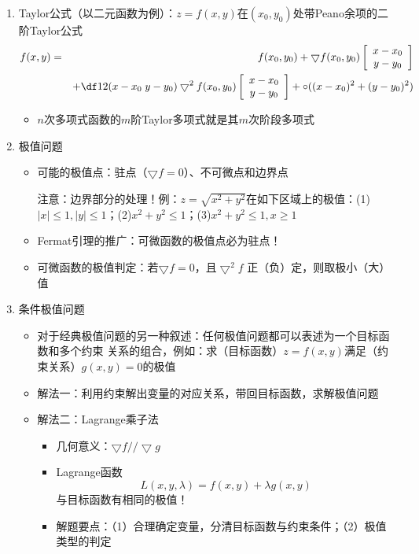 \begin{enumerate}
\begin{enumerate}[(1)]
\begin{itemize}
    \end{itemize}
    \item Taylor公式（以二元函数为例）：$z=f(x,y)$在$(x_0,y_0)$处带Peano余项的二阶Taylor公式
      \begin{eqnarray*}
      f(x,y)&=&f(x_0,y_0)+\bigtriangledown
      f(x_0,y_0)\left[\begin{array}{c}
      x-x_0\\ y-y_0
      \end{array}\right]\\
      &&+\df12(x-x_0\;y-y_0)\bigtriangledown^2f(x_0,y_0)
      \left[\begin{array}{c}
      x-x_0\\ y-y_0
      \end{array}\right]+\circ((x-x_0)^2+(y-y_0)^2)
	\end{eqnarray*}
	\begin{itemize}
	  \item $n$次多项式函数的$m$阶Taylor多项式就是其$m$次阶段多项式
	\end{itemize}
    \item 极值问题
    \begin{itemize}
      \item 可能的极值点：驻点（$\bigtriangledown f=0$）、不可微点和边界点
      
      注意：边界部分的处理！例：$z=\sqrt{x^2+y^2}$在如下区域上的极值：(1)
      $|x|\leq1,|y|\leq1$；(2)$x^2+y^2\leq 1$；(3)$x^2+y^2\leq 1,x\geq 1$
      \item Fermat引理的推广：可微函数的极值点必为驻点！
      \item 可微函数的极值判定：若$\bigtriangledown f=0$，且$\bigtriangledown^2f$
      正（负）定，则取极小（大）值
    \end{itemize}
    \item 条件极值问题
    \begin{itemize}
      \item 对于经典极值问题的另一种叙述：任何极值问题都可以表述为一个目标函数和多个约束
      关系的组合，例如：求（目标函数）$z=f(x,y)$满足（约束关系）$g(x,y)=0$的极值
      \item 解法一：利用约束解出变量的对应关系，带回目标函数，求解极值问题
      \item 解法二：Lagrange乘子法
      \begin{itemize}
        \item 几何意义：$\bigtriangledown f//\bigtriangledown g$
        \item Lagrange函数
        $$L(x,y,\lambda)=f(x,y)+\lambda g(x,y)$$
        与目标函数有相同的极值！
        \item 解题要点：（1）合理确定变量，分清目标函数与约束条件；（2）极值类型的判定
      \end{itemize}
    \end{itemize}
  \end{enumerate}
\end{enumerate}

